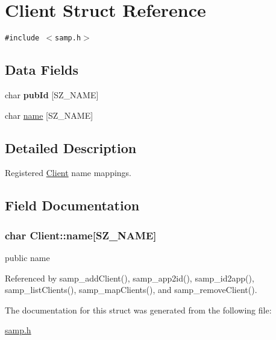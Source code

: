 \hypertarget{structClient}{
\section{Client Struct Reference}
\label{structClient}
}
{\tt \#include $<$samp.h$>$}

\subsection*{Data Fields}
\begin{CompactItemize}
\item 
\hypertarget{structClient_af50d73cb342539a50a6a5dfec290794}{
char \textbf{pubId} \mbox{[}SZ\_\-NAME\mbox{]}}
\label{structClient_af50d73cb342539a50a6a5dfec290794}

\item 
char \hyperlink{structClient_ea1486ab8cf340f8fec14dcf5e13648f}{name} \mbox{[}SZ\_\-NAME\mbox{]}
\end{CompactItemize}


\subsection{Detailed Description}
Registered \hyperlink{structClient}{Client} name mappings. 

\subsection{Field Documentation}
\hypertarget{structClient_ea1486ab8cf340f8fec14dcf5e13648f}{
\subsubsection[{name}]{\setlength{\rightskip}{0pt plus 5cm}char {\bf Client::name}\mbox{[}SZ\_\-NAME\mbox{]}}}
\label{structClient_ea1486ab8cf340f8fec14dcf5e13648f}


public name 

Referenced by samp\_\-addClient(), samp\_\-app2id(), samp\_\-id2app(), samp\_\-listClients(), samp\_\-mapClients(), and samp\_\-removeClient().

The documentation for this struct was generated from the following file:\begin{CompactItemize}
\item 
\hyperlink{samp_8h}{samp.h}\end{CompactItemize}
